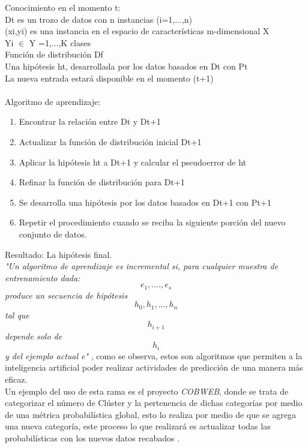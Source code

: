 			Conocimiento en el momento t: \\
			Dt es un trozo de datos con n instancias (i=1,...,n) \\
			(xi,yi) es una instancia en el espacio de características m-dimensional X\\ 
			Yi $\in$ Y ={1,...,K} clases \\
			Función de distribución Df \\
			Una hipótesis ht, desarrollada por los datos basados en Dt con Pt \\
			La nueva entrada estará disponible en el momento (t+1) \\\\
			
			Algoritmo de aprendizaje:\\
			\begin{enumerate}
				\item Encontrar la relación entre Dt y Dt+1
				\item Actualizar la función de distribución inicial Dt+1
				\item Aplicar la hipótesis ht a Dt+1 y calcular el pseudoerror de ht
				\item Refinar la función de distribución para Dt+1
				\item Se desarrolla una hipótesis por los datos basados en Dt+1 con Pt+1
				\item Repetir el procedimiento cuando se reciba la siguiente porción del nuevo conjunto de datos.
			\end{enumerate}
			Resultado: La hipótesis final.\\
		  
		
		            
                   
        
            \textit{"Un algoritmo de aprendizaje es incremental si,
            para cualquier muestra de entrenamiento dada:
            \begin{equation*}
                e_{1} , .... , e_{s}
			\end{equation*}
            produce un secuencia de hipótesis 
            \begin{equation*}
                h_{0} , h_{1}, . . . , h_{n} 
            \end{equation*}
            tal que \[ h_{i+1} \] depende solo de \[ h_i \] y del ejemplo actual e"} \cite{GiraudCarrier2000}, como se 
            observa, estos son algoritmos que permiten a la inteligencia artificial poder realizar actividades de predicci\'on 
            de una manera m\'as eficaz.\\
            
            Un ejemplo del uso de esta rama es el proyecto \textit{COBWEB}, donde se trata de categorizar el n\'umero de Cl\'uster y la pertenencia 
            de dichas categor\'ias por medio de una m\'etrica probabil\'istica global, esto lo realiza por medio de que se agrega 
            una nueva categor\'ia, este proceso lo que realizar\'a es actualizar todas las probabil\'isticas con los nuevos datos recabados \cite{fisher1987}.

